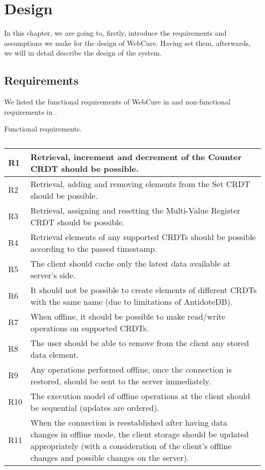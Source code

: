 \chapter{Design}
\label{Design}

In this chapter, we are going to, firstly, introduce the requirements and assumptions we make for the design of WebCure. Having set them, afterwards, we will in detail describe the design of the system.

\section{Requirements}
\label{4-Requirements}

We listed the functional requirements of WebCure in  and non-functional requirements in .

\begin{table}[!htbp]
\centering
\caption{Functional requirements.}
\label{table:req1}
\begin{tabular}{|p{1cm}|p{14cm}|}
\hline
R1 & Retrieval, increment and decrement of the Counter CRDT should be possible.                         \\ \hline
R2 & Retrieval, adding and removing elements from the Set CRDT should be possible.                       \\ \hline
R3 & Retrieval, assigning and resetting the Multi-Value Register CRDT should be possible.               \\ \hline
R4 & Retrieval elements of any supported CRDTs should be possible according to the passed timestamp. \\ \hline
R5 & The client should cache only the latest data available at server's side. \\ \hline
R6 & It should not be possible to create elements of different CRDTs with the same name (due to limitations of AntidoteDB). \\ \hline
R7 & When offline, it should be possible to make read/write operations on supported CRDTs. \\ \hline
R8 & The user should be able to remove from the client any stored data element. \\ \hline
R9 & Any operations performed offline, once the connection is restored, should be sent to the server immediately. \\ \hline
R10 & The execution model of offline operations at the client should be sequential (updates are ordered). \\ \hline 
R11 & When the connection is reestablished after having data changes in offline mode, the client storage should be updated appropriately (with a consideration of the client's offline changes and possible changes on the server). \\ \hline
\end{tabular}
\caption*{}
\end{table}

